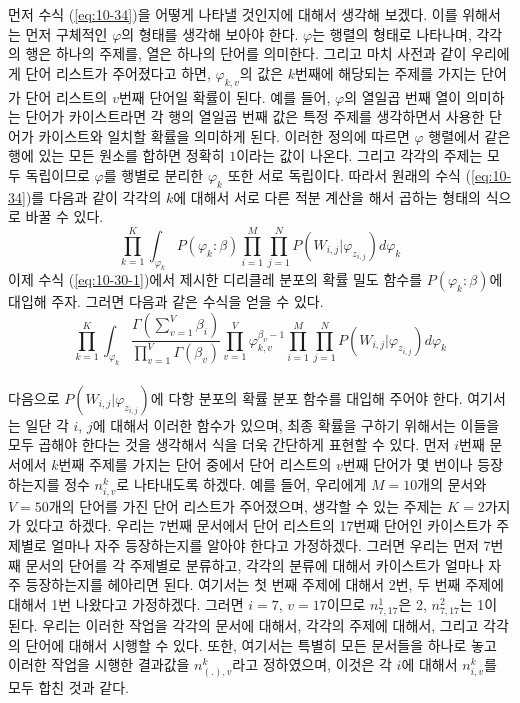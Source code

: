 \documentclass[a4paper]{oblivoir}
\begin{document}
먼저 수식 (\ref{eq:10-34})을 어떻게 나타낼 것인지에 대해서 생각해 보겠다. 이를 위해서는 먼저 구체적인 $\varphi$의 형태를 생각해 보아야 한다. $\varphi$는 행렬의 형태로 나타나며, 각각의 행은 하나의 주제를, 열은 하나의 단어를 의미한다. 그리고 마치 사전과 같이 우리에게 단어 리스트가 주어졌다고 하면, $\varphi_{k,v}$의 값은 $k$번째에 해당되는 주제를 가지는 단어가 단어 리스트의 $v$번째 단어일 확률이 된다. 예를 들어, $\varphi$의 열일곱 번째 열이 의미하는 단어가 카이스트라면 각 행의 열일곱 번째 값은 특정 주제를 생각하면서 사용한 단어가 카이스트와 일치할 확률을 의미하게 된다. 이러한 정의에 따르면 $\varphi$ 행렬에서 같은 행에 있는 모든 원소를 합하면 정확히 $1$이라는 값이 나온다. 그리고 각각의 주제는 모두 독립이므로 $\varphi$를 행별로 분리한 $\varphi_k$ 또한 서로 독립이다. 따라서 원래의 수식 (\ref{eq:10-34})를 다음과 같이 각각의 $k$에 대해서 서로 다른 적분 계산을 해서 곱하는 형태의 식으로 바꿀 수 있다. 
\begin{equation}
\prod_{k=1}^{K} \int_{\varphi_{k}} P(\varphi_{k}:\beta) \prod_{i=1}^{M} \prod_{j=1}^{N} P(W_{i,j}|\varphi_{z_{i,j}}) d\varphi_{k}
\label{eq:10-36}
\end{equation} 
이제 수식 (\ref{eq:10-30-1})에서 제시한 디리클레 분포의 확률 밀도 함수를 $P(\varphi_{k}:\beta)$에 대입해 주자. 그러면 다음과 같은 수식을 얻을 수 있다.
\begin{equation}
\prod_{k=1}^{K} \int_{\varphi_{k}} \frac{\Gamma(\sum_{v=1}^{V} \beta_{i})}{\prod_{v=1}^{V} \Gamma(\beta_{v})} \prod_{v=1}^{V} \varphi_{k,v}^{\beta_{v}-1} \prod_{i=1}^{M} \prod_{j=1}^{N} P(W_{i,j}|\varphi_{z_{i,j}}) d\varphi_{k}
\label{eq:10-37}
\end{equation} \\

다음으로 $P(W_{i,j}|\varphi_{z_{i,j}})$에 다항 분포의 확률 분포 함수를 대입해 주어야 한다. 여기서는 일단 각 $i$, $j$에 대해서 이러한 함수가 있으며, 최종 확률을 구하기 위해서는 이들을 모두 곱해야 한다는 것을 생각해서 식을 더욱 간단하게 표현할 수 있다. 먼저 $i$번째 문서에서 $k$번째 주제를 가지는 단어 중에서 단어 리스트의 $v$번째 단어가 몇 번이나 등장하는지를 정수 $n_{i,v}^{k}$로 나타내도록 하겠다. 예를 들어, 우리에게 $M=10$개의 문서와 $V=50$개의 단어를 가진 단어 리스트가 주어졌으며, 생각할 수 있는 주제는 $K=2$가지가 있다고 하겠다. 우리는 7번째 문서에서 단어 리스트의 17번째 단어인 카이스트가 주제별로 얼마나 자주 등장하는지를 알아야 한다고 가정하겠다. 그러면 우리는 먼저 7번째 문서의 단어를 각 주제별로 분류하고, 각각의 분류에 대해서 카이스트가 얼마나 자주 등장하는지를 헤아리면 된다. 여기서는 첫 번째 주제에 대해서 2번, 두 번째 주제에 대해서 1번 나왔다고 가정하겠다. 그러면 $i=7$, $v=17$이므로 $n_{7,17}^{1}$은 2, $n_{7,17}^{2}$는 1이 된다. 우리는 이러한 작업을 각각의 문서에 대해서, 각각의 주제에 대해서, 그리고 각각의 단어에 대해서 시행할 수 있다. 또한, 여기서는 특별히 모든 문서들을 하나로 놓고 이러한 작업을 시행한 결과값을 $n_{(.),v}^{k}$라고 정하였으며, 이것은 각 $i$에 대해서 $n_{i,v}^{k}$를 모두 합친 것과 같다. \\
\end{document}

